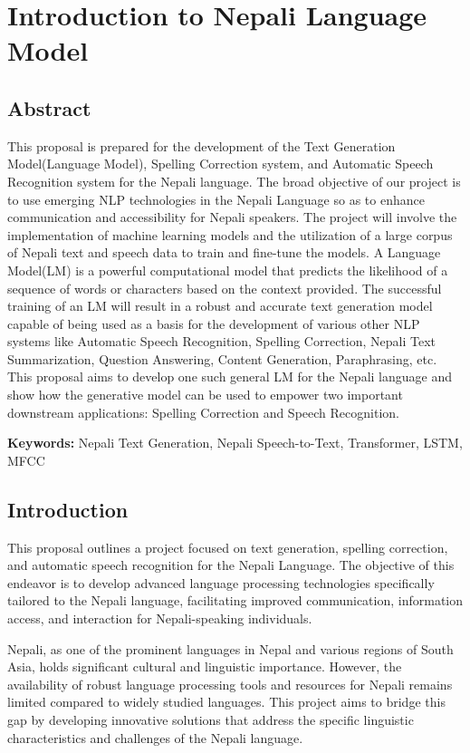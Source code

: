 \chapter{Introduction to Nepali Language Model}
\section{Abstract}
This proposal is prepared for the development of the Text Generation Model(Language Model), Spelling Correction system, and Automatic Speech Recognition system for the Nepali language. The broad objective of our project is to use emerging NLP technologies in the Nepali Language so as to enhance communication and accessibility for Nepali speakers. The project will involve the implementation of machine learning models and the utilization of a large corpus of Nepali text and speech data to train and fine-tune the models. A Language Model(LM) is a powerful computational model that predicts the likelihood of a sequence of words or characters based on the context provided. The successful training of an LM will result in a robust and accurate text generation model capable of being used as a basis for the development of various other NLP systems like Automatic Speech Recognition, Spelling Correction, Nepali Text Summarization, Question Answering, Content Generation, Paraphrasing, etc. This proposal aims to develop one such general LM for the Nepali language and show how the generative model can be used to empower two important downstream applications: Spelling Correction and Speech Recognition.


\textbf{Keywords: } Nepali Text Generation, Nepali Speech-to-Text, Transformer, LSTM, MFCC


\section{Introduction}
This proposal outlines a project focused on text generation, spelling correction, and automatic speech recognition for the Nepali Language. The objective of this endeavor is to develop advanced language processing technologies specifically tailored to the Nepali language, facilitating improved communication, information access, and interaction for Nepali-speaking individuals.

Nepali, as one of the prominent languages in Nepal and various regions of South Asia, holds significant cultural and linguistic importance. However, the availability of robust language processing tools and resources for Nepali remains limited compared to widely studied languages. This project aims to bridge this gap by developing innovative solutions that address the specific linguistic characteristics and challenges of the Nepali language.

